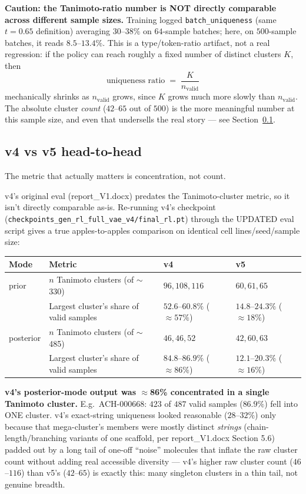\documentclass[11pt]{article}
\newcommand{\code}[1]{\texttt{#1}}
\begin{document}
\textbf{Caution: the Tanimoto-ratio number is NOT directly comparable across different sample sizes.} Training logged \code{batch\_uniqueness} (same $t=0.65$ definition) averaging $30$--$38\%$ on $64$-sample batches; here, on $500$-sample batches, it reads $8.5$--$13.4\%$. This is a type/token-ratio artifact, not a real regression: if the policy can reach roughly a fixed number of distinct clusters $K$, then
\[
  \text{uniqueness ratio} \;=\; \frac{K}{n_{\text{valid}}}
\]
mechanically shrinks as $n_{\text{valid}}$ grows, since $K$ grows much more slowly than $n_{\text{valid}}$. The absolute cluster \emph{count} ($42$--$65$ out of $500$) is the more meaningful number at this sample size, and even that undersells the real story --- see Section~\ref{sec:headtohead}.

\subsection{v4 vs v5 head-to-head}
\label{sec:headtohead}
The metric that actually matters is concentration, not count.

v4's original eval (report\_V1.docx) predates the Tanimoto-cluster metric, so it isn't directly comparable as-is. Re-running v4's checkpoint (\code{checkpoints\_gen\_rl\_full\_vae\_v4/final\_rl.pt}) through the UPDATED eval script gives a true apples-to-apples comparison on identical cell lines/seed/sample size:

\begin{center}
\begin{tabular}{@{}l l l l@{}}
\toprule
\textbf{Mode} & \textbf{Metric} & \textbf{v4} & \textbf{v5} \\
\midrule
prior & $n$ Tanimoto clusters (of $\sim$330) & $96, 108, 116$ & $60, 61, 65$ \\
      & Largest cluster's share of valid samples & $52.6$--$60.8\%$ ($\approx57\%$) & $14.8$--$24.3\%$ ($\approx18\%$) \\
posterior & $n$ Tanimoto clusters (of $\sim$485) & $46, 46, 52$ & $42, 60, 63$ \\
      & Largest cluster's share of valid samples & $84.8$--$86.9\%$ ($\approx86\%$) & $12.1$--$20.3\%$ ($\approx16\%$) \\
\bottomrule
\end{tabular}
\end{center}

\textbf{v4's posterior-mode output was $\approx$86\% concentrated in a single Tanimoto cluster.} E.g.\ ACH-000668: $423$ of $487$ valid samples ($86.9\%$) fell into ONE cluster. v4's exact-string uniqueness looked reasonable ($28$--$32\%$) only because that mega-cluster's members were mostly distinct \emph{strings} (chain-length/branching variants of one scaffold, per report\_V1.docx Section 5.6) padded out by a long tail of one-off ``noise'' molecules that inflate the raw cluster count without adding real accessible diversity --- v4's higher raw cluster count ($46$--$116$) than v5's ($42$--$65$) is exactly this: many singleton clusters in a thin tail, not genuine breadth.
\end{document}
